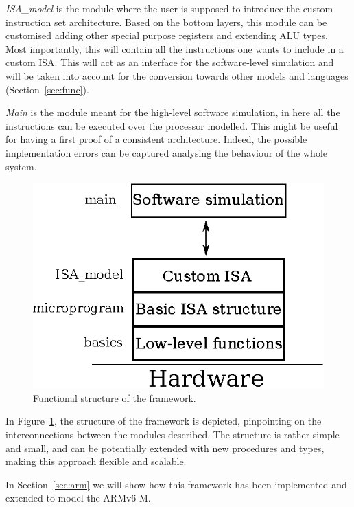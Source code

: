 \documentclass[conference]{IEEEtran}
\begin{document}
\textit{ISA\_model} is the module where the user is supposed to introduce the custom 
instruction set architecture. Based on the bottom layers, this
module can be customised adding other special purpose registers and extending ALU types.
Most importantly, this will contain all the instructions one wants to include in a custom ISA.
This will act as an interface for the software-level simulation and will be taken into
account for the conversion towards other models and languages (Section~\ref{sec:func}).

\textit{Main} is the module meant for the high-level software simulation, in here
all the instructions can be executed over the processor modelled. This might be useful
for having a first proof of a consistent architecture. Indeed, the possible implementation
errors can be captured analysing the behaviour of the whole system.

\begin{figure}[ht!]
\begin{center}
	\includegraphics[scale=1]{IMG/structure.eps}
	\caption{Functional structure of the framework.}
	\label{fig:structure}
\end{center}
\end{figure}

In Figure~\ref{fig:structure}, the structure of the framework is depicted, pinpointing 
on the interconnections between the modules described. The structure is rather simple
and small, and can be potentially extended with new procedures and types, making
this approach flexible and scalable.

In Section~\ref{sec:arm} we will show how this framework has been implemented and extended
to model the ARMv6-M.
\end{document}
